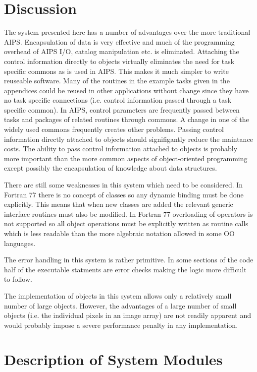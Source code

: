 \section{Discussion}

   The system presented here has a number of advantages over the more
traditional AIPS.  Encapsulation of data is very effective and much of
the programming overhead of AIPS I/O, catalog manipulation etc. is
eliminated.  Attaching the control information directly to objects
virtually eliminates the need for task specific commons as is used in
AIPS.  This makes it much simpler to write reuseable software.  Many
of the routines in the example tasks given in the appendices could be
reused in other applications without change since they have no task
specific connections (i.e. control information passed through a task
specific common).  In AIPS, control parameters are frequently passed
between tasks and packages of related routines through commons.  A
change in one of the widely used commons frequently creates other
problems.  Passing control information directly attached to objects
should signifigantly reduce the maintance costs.  The ability to pass
control information attached to objects is probably more important
than the more common aspects of object-oriented programming except
possibly the encapsulation of knowledge about data structures.

   There are still some weaknesses in this system which need to be
considered.  In Fortran 77 there is no concept of classes so any
dynamic binding
must be done explicitly.  This means that when new classes are added
the relevant generic interface routines must also be modified.
In Fortran 77 overloading of operators is not supported so all object
operations must be explicitly written as routine calls which is less
readable than the more algebraic notation allowed in some OO
languages.

   The error handling in this system is rather primitive.  In some
sections of the code half of the executable statments are error checks
making the logic more difficult to follow.

   The implementation of objects in this system allows only a
relatively small number of large objects.  However, the advantages of
a large number of small objects (i.e. the individual pixels in an
image array) are not readily apparent and would probably impose a
severe performance penalty in any implementation.

\section{Description of System Modules}

